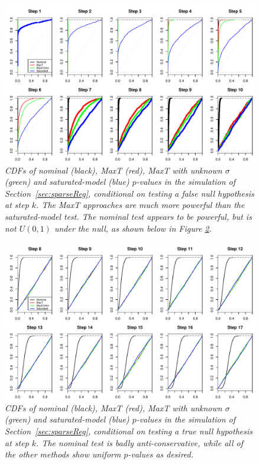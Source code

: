 \documentclass{article}
\begin{document}
\begin{figure}[h]
  \centering
  \includegraphics[width=1\textwidth]{figs/simulation_snr_5_alpha_05_null_false.pdf}
  \caption{\em  CDFs of nominal (black), MaxT (red), MaxT with unknown $\sigma$ (green) and  saturated-model (blue) $p$-values in the simulation of Section~\ref{sec:sparseReg}, conditional on testing a false null hypothesis at step $k$. The MaxT approaches are much more powerful than the saturated-model test. The nominal test appears to be powerful, 
  but is not $U(0,1)$ under the null, as shown below in Figure \ref{fig:simulation_null_true}.}
  \label{fig:simulation_null_false}
\end{figure}

\begin{figure}[h]
  \centering
  \includegraphics[width=1\textwidth]{figs/simulation_snr_5_alpha_05_null_true.pdf}
  \caption{\em  CDFs of nominal (black), MaxT (red), MaxT with unknown $\sigma$ (green) and  saturated-model (blue) $p$-values in the simulation of Section~\ref{sec:sparseReg}, conditional on testing a true null hypothesis at step $k$.  The nominal test is badly anti-conservative, while all of the other methods  show uniform $p$-values as desired.}
  \label{fig:simulation_null_true}
\end{figure}
\end{document}
